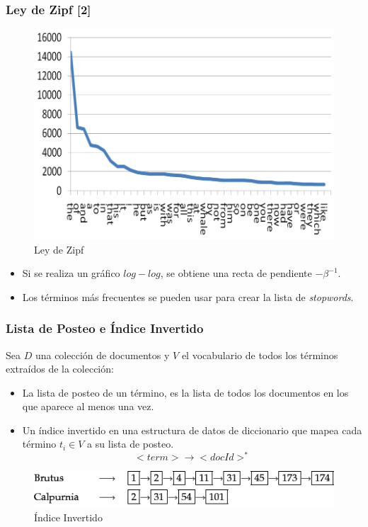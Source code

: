 \documentclass[mathserif]{beamer}
\begin{document}
\begin{frame}\frametitle{Ley de Zipf [2]}
\footnotesize{

\begin{figure}[h!]
	\centering
	\includegraphics[scale=0.5]{pics/zipf1.png}
	\caption{Ley de Zipf}
\end{figure}
\begin{itemize}
 \item Si se realiza un gráfico $log-log$, se obtiene una recta de pendiente  $-\beta^{-1}$.
 \item Los términos más frecuentes se pueden usar para crear la lista de \emph{stopwords}. 
\end{itemize}
}



 
\end{frame}

\begin{frame}\frametitle{Lista de Posteo e Índice Invertido}
{\footnotesize Sea $D$ una colección de documentos y $V$ el vocabulario de todos los términos extraídos de la colección:

\begin{itemize}
 \item La lista de posteo de un término, es la lista de todos los documentos en los que aparece al menos una vez.
 \item Un índice invertido en una estructura de datos de diccionario que mapea cada término $t_{i} \in V$ a su lista de posteo. 
 \begin{displaymath}
  <term> \rightarrow <docId>^*
 \end{displaymath}

\end{itemize}

\begin{figure}[h!]
	\centering
	\includegraphics[scale=0.6]{pics/invFile.png}
	\caption{ Índice Invertido}
\end{figure}



}
\end{frame}
\end{document}
